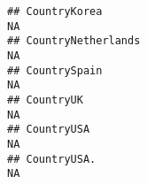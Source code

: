 \documentclass[]{article}
\begin{document}
\begin{verbatim}
## CountryKorea                                                                                                                                                                                                                                                                                                                                                                                                                                                                         NA
## CountryNetherlands                                                                                                                                                                                                                                                                                                                                                                                                                                                                   NA
## CountrySpain                                                                                                                                                                                                                                                                                                                                                                                                                                                                         NA
## CountryUK                                                                                                                                                                                                                                                                                                                                                                                                                                                                            NA
## CountryUSA                                                                                                                                                                                                                                                                                                                                                                                                                                                                           NA
## CountryUSA.                                                                                                                                                                                                                                                                                                                                                                                                                                                                          NA

\end{verbatim}
\end{document}
